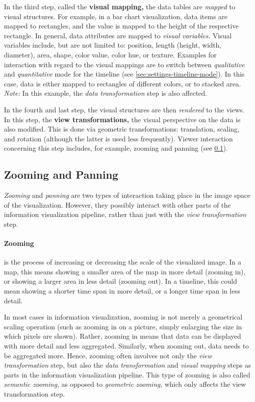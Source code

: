 In the third step, called the \textbf{visual mapping,} the data tables are \emph{mapped} to visual structures.
For example, in a bar chart visualization, data items are mapped to rectangles, and the value is mapped to the height of the respective rectangle.
In general, data attributes are mapped to \emph{visual variables.}
Visual variables include, but are not limited to:
position, length (height, width, diameter), area, shape, color value, color hue, or texture.
Examples for interaction with regard to the visual mappings are to switch between \emph{qualitative} and \emph{quantitative} mode for the timeline (see \cref{sec:settings-timeline-mode}).
In this case, data is either mapped to rectangles of different colors, or to stacked area.
\emph{Note:} In this example, the \emph{data transformation} step is also affected.

In the fourth and last step, the visual structures are then \emph{rendered} to the views.
In this step, the \textbf{view transformations,} the visual perspective on the data is also modified.
This is done via geometric transformations: translation, scaling, and rotation (although the latter is used less frequently).
Viewer interaction concerning this step includes, for example, zooming and panning (see \cref{sec:terminology-zooming-panning}).

\subsection{Zooming and Panning}
\label{sec:terminology-zooming-panning}

\emph{Zooming} and \emph{panning} are two types of interaction taking place in the image space of the visualization.
However, they possibly interact with other parts of the information visualization pipeline, rather than just with the \emph{view transformation} step.

\paragraph{Zooming} is the process of increasing or decreasing the scale of the visualized image.
In a map, this means showing a smaller area of the map in more detail (zooming in), or showing a larger area in less detail (zooming out).
In a timeline, this could mean showing a shorter time span in more detail, or a longer time span in less detail.

In most cases in information visualization, zooming is not merely a geometrical scaling operation (such as zooming in on a picture, simply enlarging the size in which pixels are shown).
Rather, zooming in means that data can be displayed with more detail and less aggregated.
Similarly, when zooming out, data needs to be aggregated more.
Hence, zooming often involves not only the \emph{view transformation} step, but also the \emph{data transformation} and \emph{visual mapping} steps as parts in the information visualization pipeline.
This type of zooming is also called \emph{semantic zooming,}
as opposed to \emph{geometric zooming,} which only affects the view transformation step.

